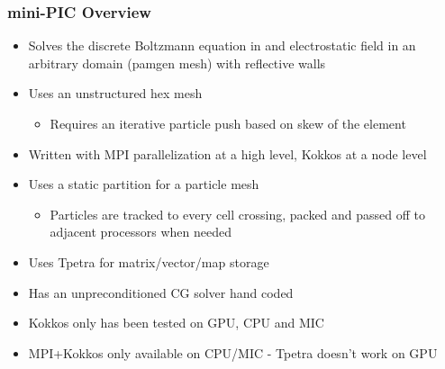 \documentclass[t]{beamer}
\begin{document}
\begin{frame}
 
 \frametitle{mini-PIC Overview}
 \begin{itemize}
 \item Solves the discrete Boltzmann equation in and
   electrostatic field in an arbitrary domain (pamgen mesh) with reflective walls
 \item Uses an unstructured hex mesh
\begin{itemize}
 \item Requires an iterative particle push based on skew of the element
 \end{itemize}

 \item Written with MPI parallelization at a high level, Kokkos at a node level
 \item Uses a static partition for a particle mesh
 \begin{itemize}
 \item Particles are tracked to every cell crossing, packed and passed off to adjacent processors when needed
 \end{itemize}
 \item Uses Tpetra for matrix/vector/map storage
 \item Has an unpreconditioned CG solver hand coded
 \item Kokkos only has been tested on GPU, CPU and MIC
 \item MPI+Kokkos only available on CPU/MIC - Tpetra doesn't work on GPU
 \end{itemize}
\end{frame}
\end{document}
